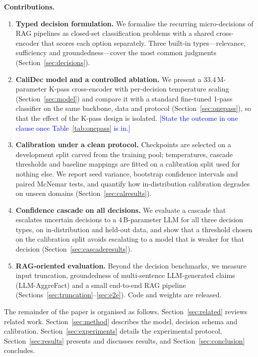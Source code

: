 \documentclass[twocolumn]{ICCKjournal}
\newcommand{\revnote}[1]{\textcolor{blue}{[#1]}}
\begin{document}
\textbf{Contributions.}
\begin{enumerate}[leftmargin=*]
    \item \textbf{Typed decision formulation.} We formalise the recurring micro-decisions of RAG pipelines as closed-set classification problems with a shared cross-encoder that scores each option separately. Three built-in types---relevance, sufficiency and groundedness---cover the most common judgments (Section~\ref{sec:decisions}).
    \item \textbf{CaliDec model and a controlled ablation.} We present a 33.4\,M-parameter K-pass cross-encoder with per-decision temperature scaling (Section~\ref{sec:model}) and compare it with a standard fine-tuned 1-pass classifier on the same backbone, data and protocol (Section~\ref{sec:onepass}), so that the effect of the K-pass design is isolated. \revnote{State the outcome in one clause once Table~\ref{tab:onepass} is in.}
    \item \textbf{Calibration under a clean protocol.} Checkpoints are selected on a development split carved from the training pool; temperatures, cascade thresholds and baseline mappings are fitted on a calibration split used for nothing else. We report seed variance, bootstrap confidence intervals and paired McNemar tests, and quantify how in-distribution calibration degrades on unseen domains (Section~\ref{sec:calresults}).
    \item \textbf{Confidence cascade on all decisions.} We evaluate a cascade that escalates uncertain decisions to a 4\,B-parameter LLM for all three decision types, on in-distribution and held-out data, and show that a threshold chosen on the calibration split avoids escalating to a model that is weaker for that decision (Section~\ref{sec:cascaderesults}).
    \item \textbf{RAG-oriented evaluation.} Beyond the decision benchmarks, we measure input truncation, groundedness of multi-sentence LLM-generated claims (LLM-AggreFact) and a small end-to-end RAG pipeline (Sections~\ref{sec:truncation}--\ref{sec:e2e}). Code and weights are released.
\end{enumerate}

The remainder of the paper is organised as follows. Section~\ref{sec:related} reviews related work. Section~\ref{sec:method} describes the model, decision schema and calibration. Section~\ref{sec:experiments} details the experimental protocol, Section~\ref{sec:results} presents and discusses results, and Section~\ref{sec:conclusion} concludes.
\end{document}
